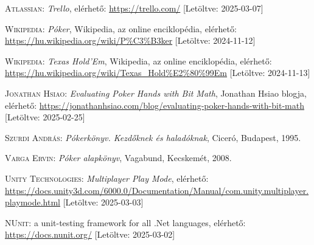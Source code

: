 \documentclass[]{thesis-ekf}
\theoremstyle{definition}
\theoremstyle{remark}
\begin{document}
\begin{thebibliography}{2}
	\textsc{Atlassian}: \emph{Trello}, elérhető:
	\url{https://trello.com/} [Letöltve: 2025-03-07]
	
	\textsc{Wikipedia}: \emph{Póker}, Wikipedia, az online enciklopédia, elérhető: \url{https://hu.wikipedia.org/wiki/P%C3%B3ker} [Letöltve: 2024-11-12]
	
	\textsc{Wikipedia}: \emph{Texas Hold'Em}, Wikipedia, az online enciklopédia, elérhető: \url{https://hu.wikipedia.org/wiki/Texas_Hold%E2%80%99Em} [Letöltve: 2024-11-13]
	
	\textsc{Jonathan Hsiao}: \emph{Evaluating Poker Hands with Bit Math}, Jonathan Hsiao blogja, elérhető: \url{https://jonathanhsiao.com/blog/evaluating-poker-hands-with-bit-math} [Letöltve: 2025-02-25]
	
	\textsc{Szurdi András}: \emph{Pókerkönyv. Kezdőknek és haladóknak}, Ciceró, Budapest, 1995.
	
	\textsc{Varga Ervin}: \emph{Póker alapkönyv}, Vagabund, Kecskemét, 2008.
	
	\textsc{Unity Technologies}: \emph{Multiplayer Play Mode}, elérhető:
	\url{https://docs.unity3d.com/6000.0/Documentation/Manual/com.unity.multiplayer.playmode.html} [Letöltve: 2025-03-03]
	
	\textsc{NUnit}: a unit-testing framework for all .Net languages, elérhető: \url{https://docs.nunit.org/} [Letöltve: 2025-03-02]
	
\end{thebibliography}

%
\end{document}
